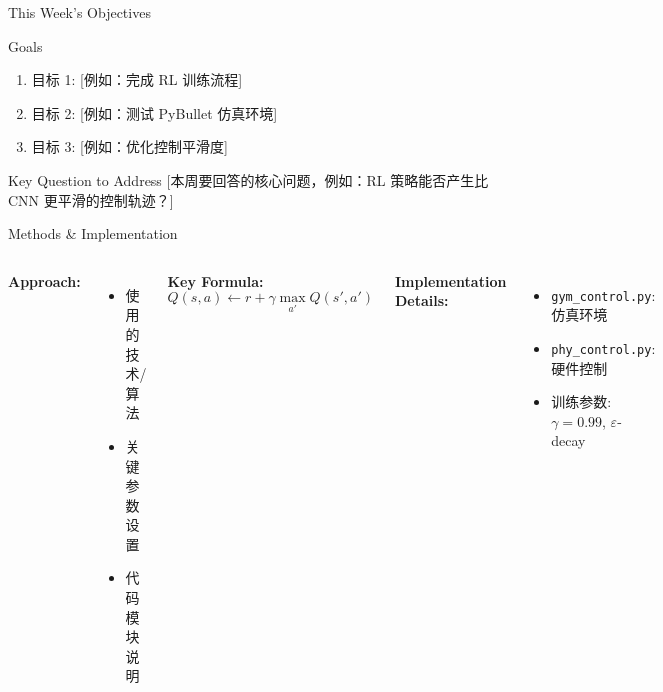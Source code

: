 \documentclass[aspectratio=169, 11pt]{beamer}
\begin{document}
\begin{frame}{This Week's Objectives}
    \begin{block}{Goals}
        \begin{enumerate}
            \item 目标 1: [例如：完成 RL 训练流程]
            \item 目标 2: [例如：测试 PyBullet 仿真环境]
            \item 目标 3: [例如：优化控制平滑度]
        \end{enumerate}
    \end{block}
    
    \vspace{5mm}
    
    \begin{alertblock}{Key Question to Address}
        [本周要回答的核心问题，例如：RL 策略能否产生比 CNN 更平滑的控制轨迹？]
    \end{alertblock}
\end{frame}

\begin{frame}{Methods \& Implementation}
    \begin{columns}[T]
        \textbf{Approach:}
        \begin{itemize}
            \item 使用的技术/算法
            \item 关键参数设置
            \item 代码模块说明
        \end{itemize}
        
        \vspace{3mm}
        \textbf{Key Formula:}
        \begin{equation*}
            Q(s,a) \leftarrow r + \gamma \max_{a'} Q(s',a')
        \end{equation*}
        
        \textbf{Implementation Details:}
        \begin{itemize}
            \item \texttt{gym\_control.py}: 仿真环境
            \item \texttt{phy\_control.py}: 硬件控制
            \item 训练参数: $\gamma=0.99$, $\varepsilon$-decay
        \end{itemize}
    \end{columns}
\end{frame}
\end{document}
